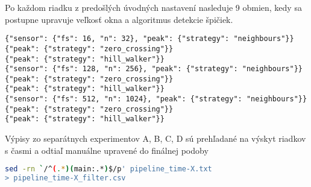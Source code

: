 \noindent Po každom riadku z predošlých úvodných nastavení nasleduje 9 obmien, kedy
sa postupne upravuje veľkosť okna a algoritmus detekcie špičiek.
\begin{lstlisting}[style=experiments]
{"sensor": {"fs": 16, "n": 32}, "peak": {"strategy": "neighbours"}}
{"peak": {"strategy": "zero_crossing"}}
{"peak": {"strategy": "hill_walker"}}
{"sensor": {"fs": 128, "n": 256}, "peak": {"strategy": "neighbours"}}
{"peak": {"strategy": "zero_crossing"}}
{"peak": {"strategy": "hill_walker"}}
{"sensor": {"fs": 512, "n": 1024}, "peak": {"strategy": "neighbours"}}
{"peak": {"strategy": "zero_crossing"}}
{"peak": {"strategy": "hill_walker"}}
\end{lstlisting}

\noindent Výpisy zo separátnych experimentov A, B, C, D sú prehľadané na výskyt riadkov s časmi a odtiaľ 
manuálne upravené do finálnej podoby
\begin{lstlisting}[style=messages, language=sh]
sed -rn `/^(.*)(main:.*)$/p' pipeline_time-X.txt 
> pipeline_time-X_filter.csv
\end{lstlisting}
